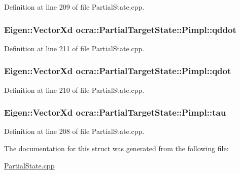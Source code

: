 Definition at line 209 of file Partial\+State.\+cpp.

\subsubsection[{\texorpdfstring{qddot}{qddot}}]{\setlength{\rightskip}{0pt plus 5cm}Eigen\+::\+Vector\+Xd ocra\+::\+Partial\+Target\+State\+::\+Pimpl\+::qddot}\hypertarget{structocra_1_1PartialTargetState_1_1Pimpl_ae9c10dd0f603be49ec43fdf69f8d6556}{}\label{structocra_1_1PartialTargetState_1_1Pimpl_ae9c10dd0f603be49ec43fdf69f8d6556}


Definition at line 211 of file Partial\+State.\+cpp.

\subsubsection[{\texorpdfstring{qdot}{qdot}}]{\setlength{\rightskip}{0pt plus 5cm}Eigen\+::\+Vector\+Xd ocra\+::\+Partial\+Target\+State\+::\+Pimpl\+::qdot}\hypertarget{structocra_1_1PartialTargetState_1_1Pimpl_a788a4c8818c07f7cd401d3a7cf1cf5c4}{}\label{structocra_1_1PartialTargetState_1_1Pimpl_a788a4c8818c07f7cd401d3a7cf1cf5c4}


Definition at line 210 of file Partial\+State.\+cpp.

\subsubsection[{\texorpdfstring{tau}{tau}}]{\setlength{\rightskip}{0pt plus 5cm}Eigen\+::\+Vector\+Xd ocra\+::\+Partial\+Target\+State\+::\+Pimpl\+::tau}\hypertarget{structocra_1_1PartialTargetState_1_1Pimpl_a68194144a3fdbdb73744178332101ed0}{}\label{structocra_1_1PartialTargetState_1_1Pimpl_a68194144a3fdbdb73744178332101ed0}


Definition at line 208 of file Partial\+State.\+cpp.



The documentation for this struct was generated from the following file\+:\begin{DoxyCompactItemize}
\item 
\hyperlink{PartialState_8cpp}{Partial\+State.\+cpp}\end{DoxyCompactItemize}
